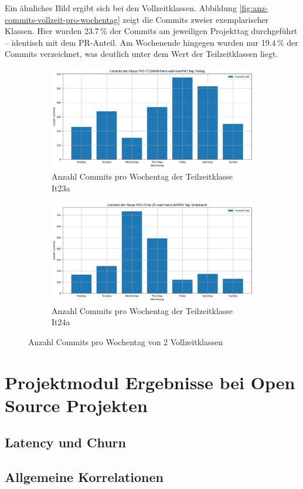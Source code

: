 Ein ähnliches Bild ergibt sich bei den Vollzeitklassen. Abbildung \autoref{fig:anz-commits-vollzeit-pro-wochentag} zeigt die Commits zweier exemplarischer Klassen. Hier wurden 23.7\,\% der Commits am jeweiligen Projekttag durchgeführt – identisch mit dem PR-Anteil. Am Wochenende hingegen wurden nur 19.4\,\% der Commits verzeichnet, was deutlich unter dem Wert der Teilzeitklassen liegt.

\begin{figure}[htbp]
    \centering
    \begin{subfigure}[b]{0.48\textwidth}
        \centering
        \includegraphics[width=\textwidth]{Figures/commits-klasse-per-wochentag-23a.png}
         \caption{Anzahl Commits pro Wochentag der Teilzeitklasse It23a}
        \label{fig:anzahl-commits-pro-wochentag-it23a}
    \end{subfigure}
    \hfill
    \begin{subfigure}[b]{0.48\textwidth}
        \centering
        \includegraphics[width=\textwidth]{Figures/commits-klasse-per-wochentag-24a.png}
         \caption{Anzahl Commits pro Wochentag der Teilzeitklasse It24a}
        \label{fig:anzahl-commits-pro-wochentag-it24a}
    \end{subfigure}
    \caption{Anzahl Commits pro Wochentag von 2 Vollzeitklassen}
    \label{fig:anz-commits-vollzeit-pro-wochentag}
\end{figure}

\section{Projektmodul Ergebnisse bei Open Source Projekten}
\subsection{Latency und Churn}
\subsection{Allgemeine Korrelationen}
